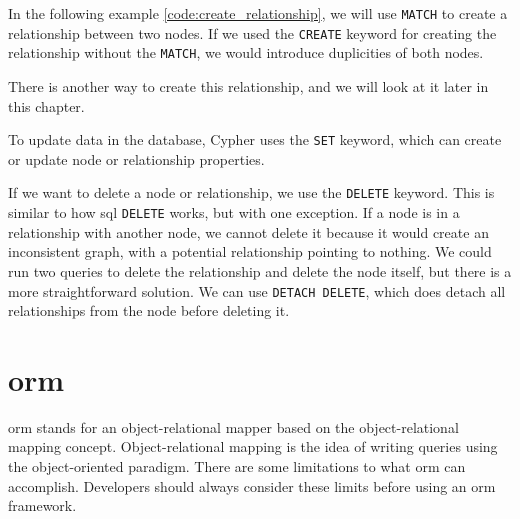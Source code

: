 In the following example \ref{code:create_relationship}, we will use \texttt{MATCH} to create a relationship between two nodes.
If we used the \texttt{CREATE} keyword for creating the relationship without the \texttt{MATCH}, we would introduce duplicities of both nodes.


There is another way to create this relationship, and we will look at it later in this chapter.

To update data in the database, Cypher uses the \texttt{SET} keyword, which can create or update node or relationship properties.

If we want to delete a node or relationship, we use the \texttt{DELETE} keyword.
This is similar to how \acrshort{sql} \texttt{DELETE} works, but with one exception. If a node is in a relationship
with another node, we cannot delete it because it would create an inconsistent graph, with a potential relationship pointing to nothing. \cite{noauthor_updating_nodate}
We could run two queries to delete the relationship and delete the node itself, but there is a more straightforward solution.
We can use \texttt{DETACH DELETE}, which does detach all relationships from the node before deleting it.

\section{\acrshort{orm}}
\acrshort{orm} stands for an object-relational mapper based on the object-relational mapping concept.
Object-relational mapping is the idea of writing queries using the object-oriented paradigm.
There are some limitations to what \acrshort{orm} can accomplish.
Developers should always consider these limits before using an \acrshort{orm} framework. \cite{mario_hoyos_what_2018}


